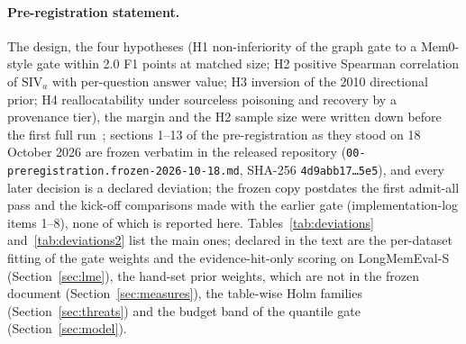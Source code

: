 \documentclass{ceurart}
\newcommand{\SIVa}{\mathrm{SIV}_a}
\newcommand{\code}[1]{\texttt{#1}}
\begin{document}
\paragraph{Pre-registration statement.}
\label{sec:prereg}
The design, the four hypotheses (H1 non-inferiority of the graph gate to a Mem0-style gate within 2.0 F1 points at matched size; H2 positive Spearman correlation of $\SIVa$ with per-question answer value; H3 inversion of the 2010 directional prior; H4 reallocatability under sourceless poisoning and recovery by a provenance tier), the margin and the H2 sample size were written down before the first full run~\cite{nosek2018prereg}; sections 1--13 of the pre-registration as they stood on 18 October 2026 are frozen verbatim in the released repository (\code{00-preregistration.frozen-2026-10-18.md}, SHA-256 \code{4d9abb17\ldots5e5}), and every later decision is a declared deviation; the frozen copy postdates the first admit-all pass and the kick-off comparisons made with the earlier gate (implementation-log items 1--8), none of which is reported here. Tables~\ref{tab:deviations} and~\ref{tab:deviations2} list the main ones; declared in the text are the per-dataset fitting of the gate weights and the evidence-hit-only scoring on LongMemEval-S (Section~\ref{sec:lme}), the hand-set prior weights, which are not in the frozen document (Section~\ref{sec:measures}), the table-wise Holm families (Section~\ref{sec:threats}) and the budget band of the quantile gate (Section~\ref{sec:model}).
\end{document}
